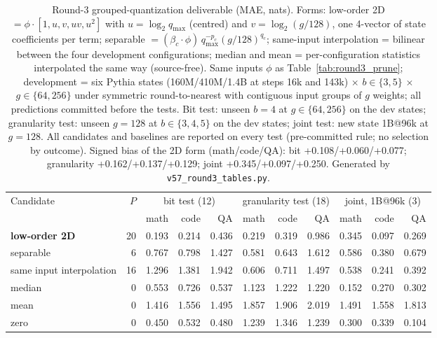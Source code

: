 \begin{table}[t]\centering\footnotesize\setlength{\tabcolsep}{2.5pt}
\begin{tabular}{@{}lrrrrrrrrrr@{}}
\toprule
Candidate & $P$ & \multicolumn{3}{c}{bit test (12)} & \multicolumn{3}{c}{granularity test (18)} & \multicolumn{3}{c}{joint, 1B@96k (3)} \\
\cmidrule(lr){3-5}\cmidrule(lr){6-8}\cmidrule(lr){9-11}
 & & math & code & QA & math & code & QA & math & code & QA \\
\midrule
\textbf{low-order 2D} & 20 & 0.193 & 0.214 & 0.436 & 0.219 & 0.319 & 0.986 & 0.345 & 0.097 & 0.269 \\
separable & 6 & 0.767 & 0.798 & 1.427 & 0.581 & 0.643 & 1.612 & 0.586 & 0.380 & 0.679 \\
same input interpolation & 16 & 1.296 & 1.381 & 1.942 & 0.606 & 0.711 & 1.497 & 0.538 & 0.241 & 0.392 \\
median & 0 & 0.553 & 0.726 & 0.537 & 1.123 & 1.222 & 1.220 & 0.152 & 0.270 & 0.302 \\
mean & 0 & 1.416 & 1.556 & 1.495 & 1.857 & 1.906 & 2.019 & 1.491 & 1.558 & 1.813 \\
zero & 0 & 0.450 & 0.532 & 0.480 & 1.239 & 1.346 & 1.239 & 0.300 & 0.339 & 0.104 \\
\bottomrule\end{tabular}
\caption{Round-3 grouped-quantization deliverable (MAE, nats). Forms: low-order 2D $=\phi\cdot[1,u,v,uv,u^2]$ with $u=\log_2 q_{\max}$ (centred) and $v=\log_2(g/128)$, one 4-vector of state coefficients per term; separable $=(\beta_c\cdot\phi)\,q_{\max}^{-p_c}(g/128)^{q_c}$; same-input interpolation = bilinear between the four development configurations; median and mean = per-configuration statistics interpolated the same way (source-free). Same inputs $\phi$ as Table~\ref{tab:round3_prune}; development = six Pythia states (160M/410M/1.4B at steps 16k and 143k) $\times$ $b\in\{3,5\}$ $\times$ $g\in\{64,256\}$ under symmetric round-to-nearest with contiguous input groups of $g$ weights; all predictions committed before the tests. Bit test: unseen $b{=}4$ at $g\in\{64,256\}$ on the dev states; granularity test: unseen $g{=}128$ at $b\in\{3,4,5\}$ on the dev states; joint test: new state 1B@96k at $g{=}128$. All candidates and baselines are reported on every test (pre-committed rule; no selection by outcome). Signed bias of the 2D form (math/code/QA): bit +0.108/+0.060/+0.077; granularity +0.162/+0.137/+0.129; joint +0.345/+0.097/+0.250. Generated by \texttt{v57\_round3\_tables.py}.}
\label{tab:round3_quant}\end{table}

